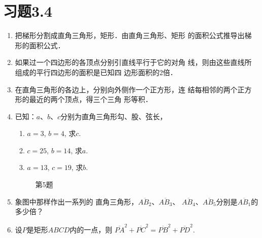\section*{习题3.4}
\begin{enumerate}
    \item 把梯形分割成直角三角形，矩形．由直角三角形、矩形
    的面积公式推导出梯形的面积公式．
    \item 如果过一个四边形的各顶点分别引直线平行于它的对角
    线，则由这些直线所组成的平行四边形的面积是已知四
    边形面积的2倍．
    \item 在直角三角形的各边上，分别向外侧作一个正方形，连
    结每相邻的两个正方形的最近的两个顶点，得三个三角
    形等积．
    \item 已知：$a$、$b$、$c$分别为直角三角形勾、股、弦长，
    \begin{enumerate}
        \item $a=3$, $b=4$, 求$c$.
        \item $c=25$, $b=14$, 求$a$.
     \item $a=13$, $c=19$, 求$b$.
    \end{enumerate}

    \begin{figure}[htp]
    \centering
{}    
    \caption*{第5题}
\end{figure}

\item 象图中那样作出一系列的
直角三角形，$\overline{AB_2}$、$\overline{AB_3}$、
$\overline{AB_4}$、$\overline{AB_5}$分别是$\overline{AB_1}$的
多少倍？
\item 设$P$是矩形$ABCD$内的一点，则
$\overline{PA}^2+\overline{PC}^2=\overline{PB}^2+\overline{PD}^2$.


\end{enumerate}
